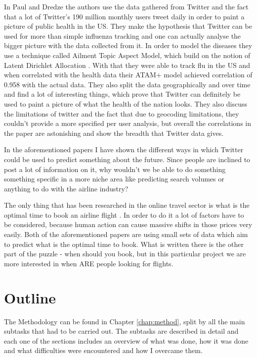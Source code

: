 \documentclass[minf,twoside,singlespacing,parskip,frontabs]{infthesis}
\begin{document}
In Paul and Dredze \cite{twitflu} the authors use the data gathered from Twitter and the fact that a lot of Twitter's 190 million monthly users tweet daily \cite{TwitStat} in order to paint a picture of public health in the US. They make the hypothesis that Twitter can be used for more than simple influenza tracking and one can actually analyse the bigger picture with the data collected from it. In order to model the diseases they use a technique called Ailment Topic Aspect Model, which build on the notion of Latent Dirichlet Allocation \cite{lda}. With that they were able to track flu in the US and when correlated with the health data their ATAM+ model achieved correlation of 0.958 with the actual data. They also split the data geographically and over time and find a lot of interesting things, which prove that Twitter can definitely be used to paint a picture of what the health of the nation looks. They also discuss the limitations of twitter and the fact that due to geocoding limitations, they couldn't provide a more specified per user analysis, but overall the correlations in the paper are astonishing and show the breadth that Twitter data gives. 


In the aforementioned papers I have shown the different ways in which Twitter could be used to predict something about the future. Since people are inclined to post a lot of information on it, why wouldn't we be able to do something something specific in a more niche area like predicting search volumes or anything to do with the airline industry?

The only thing that has been researched in the online travel sector is what is the optimal time to book an airline flight \cite{Hamletkdd03,ijcai}.  In order to do it a lot of factors have to be considered, because human action can cause massive shifts in those prices very easily. 
Both of the aforementioned papers are using small sets of data which aim to predict what is the optimal time to book. What is written there is the other part of the puzzle - when should you book, but in this particular project we are more interested in when ARE people looking for flights.

\section{Outline}

The Methodology can be found in Chapter \ref{chap:method}, split by all the main subtasks that had to be carried out. The subtasks are described in detail and each one of the sections includes an overview of what was done, how it was done and what difficulties were encountered and how I overcame them. 
\end{document}
